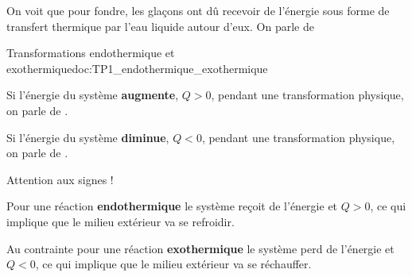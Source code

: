 

\newpage
\vspace*{-12pt}

On voit que pour fondre, les glaçons ont dû recevoir de l'énergie sous forme de transfert thermique par l'eau liquide autour d'eux.
On parle de 

\begin{doc}{Transformations endothermique et exothermique}{doc:TP1_endothermique_exothermique}
  \begin{importants}
    \begin{listePoints}
      \item Si l'énergie du système \textbf{augmente}, $Q > 0$, pendant une transformation physique, on parle de .
      \item Si l'énergie du système \textbf{diminue}, $Q < 0$, pendant une transformation physique, on parle de .
    \end{listePoints}
  \end{importants}
  \begin{center}
  \end{center}
  \attention Attention aux signes !
  
  \begin{listePoints}
    \item Pour une réaction \textbf{endothermique} le système reçoit de l'énergie et $Q > 0$, ce qui implique que le milieu extérieur va se refroidir. 
    \item Au contrainte pour une réaction \textbf{exothermique} le système perd de l'énergie et $Q < 0$, ce qui implique que le milieu extérieur va se réchauffer.
  \end{listePoints}
\end{doc}
